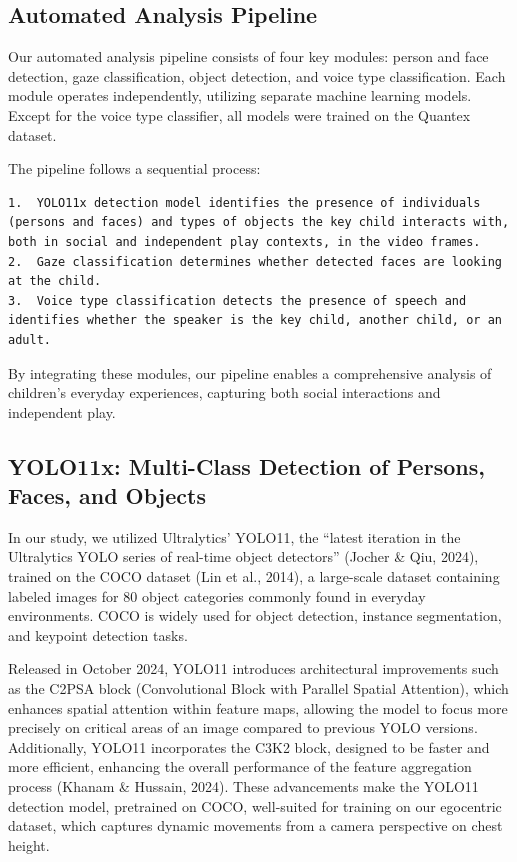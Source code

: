 \documentclass[
  man,floatsintext]{apa6}
\begin{document}
\subsection{Automated Analysis Pipeline}\label{sup-automatic-analysis}

Our automated analysis pipeline consists of four key modules: person and face detection, gaze classification, object detection, and voice type classification. Each module operates independently, utilizing separate machine learning models. Except for the voice type classifier, all models were trained on the Quantex dataset.

The pipeline follows a sequential process:

\begin{verbatim}
1.  YOLO11x detection model identifies the presence of individuals (persons and faces) and types of objects the key child interacts with, both in social and independent play contexts, in the video frames.
2.  Gaze classification determines whether detected faces are looking at the child.
3.  Voice type classification detects the presence of speech and identifies whether the speaker is the key child, another child, or an adult.
\end{verbatim}

By integrating these modules, our pipeline enables a comprehensive analysis of children's everyday experiences, capturing both social interactions and independent play.

\subsection{YOLO11x: Multi-Class Detection of Persons, Faces, and Objects}\label{sup-yolo11x}

In our study, we utilized Ultralytics' YOLO11, the ``latest iteration in the Ultralytics YOLO series of real-time object detectors'' (Jocher \& Qiu, 2024), trained on the COCO dataset (Lin et al., 2014), a large-scale dataset containing labeled images for 80 object categories commonly found in everyday environments. COCO is widely used for object detection, instance segmentation, and keypoint detection tasks.

Released in October 2024, YOLO11 introduces architectural improvements such as the C2PSA block (Convolutional Block with Parallel Spatial Attention), which enhances spatial attention within feature maps, allowing the model to focus more precisely on critical areas of an image compared to previous YOLO versions. Additionally, YOLO11 incorporates the C3K2 block, designed to be faster and more efficient, enhancing the overall performance of the feature aggregation process (Khanam \& Hussain, 2024). These advancements make the YOLO11 detection model, pretrained on COCO, well-suited for training on our egocentric dataset, which captures dynamic movements from a camera perspective on chest height.
\end{document}
